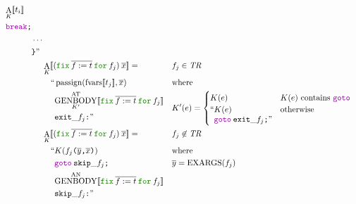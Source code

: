 \documentclass[a4paper,fleqn]{article}
\newcommand{\kwfix}{\mbox{\color{mygreen}\ttfamily fix}}
\newcommand{\kwfor}{\mbox{\color{mygreen}\ttfamily for}}
\newcommand{\ofix}[2]{\kwfix\:{#1}\:\kwfor\:{#2}}
\DeclareMathOperator{\EXARGS}{EXARGS}
\newcommand{\BRA}[1]{\llbracket #1 \rrbracket}
\DeclareMathOperator{\genbody}{GENBODY}
\newcommand{\genbodyat}[2]{\genbody^\mathrm{AT}_{#1}\BRA{#2}}
\newcommand{\genbodyan}[1]{\genbody^\mathrm{AN}\BRA{#1}}
\newcommand{\tr}{\mathit{TR}}
\newcommand{\ldq}{\text{``}}
\newcommand{\rdq}{\text{''}}
\newcommand{\ttparen}[1]{\texttt{(}#1\texttt{)}}
\newcommand{\ttrbrace}{\texttt{\char '175}}
\newcommand{\ttsemi}{\texttt{;}}
\newcommand{\ttcomma}{\texttt{,}}
\newcommand{\ttcolon}{\texttt{:}}
\newcommand{\kwbreak}{\mbox{\color{myviolet}\ttfamily break}}
\newcommand{\kwgoto}{\mbox{\color{myviolet}\ttfamily goto}}
\DeclareMathOperator{\passign}{passign}
\DeclareMathOperator{\fvarsop}{fvars}
\newcommand{\fvars}[1]{\fvarsop\BRA{#1}}
\DeclareMathOperator{\Aop}{A}
\newcommand{\A}[2]{\Aop_{#1}\BRA{#2}}
\newcommand{\rep}[1]{\overline{#1}}
\begin{document}
\begin{align*}
\begin{alignedat}{2}
\begin{aligned}[t]
              & {\A{K}{t_i}} \\
              & \kwbreak\ttsemi
              \end{aligned} \\
            & \cdots \\
            & \ttrbrace\rdq
       \end{alignedat} \\
  &\A{K}{(\ofix{\rep{f:=t}}{f_j})\:\rep{x}} =                   && f_j \in \tr \\
     & \quad\begin{alignedat}[t]{2}
       \ldq & \passign(\fvars{t_j}, \rep{x}) \\
            & {\genbodyat{K'}{\ofix{\rep{f:=t}}{f_j}}} \\
            & \mathtt{exit\_}f_j\ttcolon \rdq
       \end{alignedat} &&
               \begin{alignedat}[t]{1}
                  & \text{where} \\
                  & K'(e) =
                    \begin{cases}
                    K(e) & \text{$K(e)$ contains \kwgoto}  \\
                    \begin{aligned}[t]
                      \ldq & K(e) \\
                           & \kwgoto\:\mathtt{exit\_}f_j\ttsemi \rdq
                    \end{aligned} & \text{otherwise}
                  \end{cases}
                \end{alignedat} \\
  &\A{K}{(\ofix{\rep{f:=t}}{f_j})\:\rep{x}} =                      && f_j \not\in \tr \\
     & \quad\begin{alignedat}[t]{2}
       \ldq & K(f_j\ttparen{\rep{y}\ttcomma \rep{x}})                  \\
            & \kwgoto\:\mathtt{skip\_}f_j\ttsemi                                    \\
            & {\genbodyan{\ofix{\rep{f:=t}}{f_j}}}                          \\
            & \mathtt{skip\_}f_j\ttcolon \rdq
       \end{alignedat} &&
               \begin{alignedat}[t]{1}
                  & \text{where} \\
                  & \rep{y} = \EXARGS(f_j)
               \end{alignedat}
\end{align*}
\end{document}
